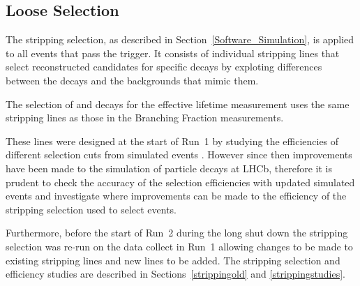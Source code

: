 \subsection{Loose Selection}
\label{sec:stripping}


The stripping selection, as described in Section~\ref{Software_Simulation}, is applied to all events that pass the trigger. It consists of individual stripping lines that select reconstructed candidates for specific decays by exploting differences between the decays and the backgrounds that mimic them. 

The selection of \bsmumu and \bhh decays for the \bsmumu effective lifetime measurement uses the same stripping lines as those in the \bmumu Branching Fraction measurements. 



These lines were designed at the start of Run~1 by studying the efficiencies of different selection cuts from simulated events \cite{}. However since then improvements have been made to the simulation of particle decays at LHCb, therefore it is prudent to check the accuracy of the selection efficiencies with updated simulated events and investigate where improvements can be made to the efficiency of the stripping selection used to select \bsmumu events.  %

Furthermore,  before the start of Run~2 during the long shut down the stripping selection was re-run on the data collect in Run~1 allowing changes to be made to existing stripping lines and new lines to be added. The stripping selection and efficiency studies are described in Sections~\ref{strippingold} and \ref{strippingstudies}. 


